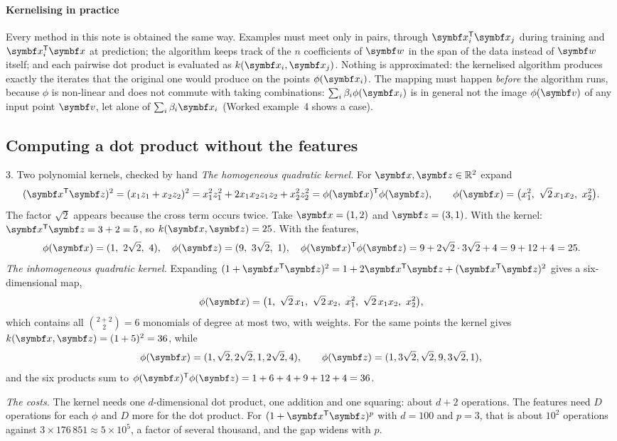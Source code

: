 \documentclass[11pt]{article}
\newcommand{\w}{\vect{w}}
\newcommand{\z}{\vect{z}}
\begin{document}
\paragraph{Kernelising in practice} Every method in this note is obtained the same way. Examples must meet only in
pairs, through $\x_i\T\x_j$ during training and $\x_i\T\x$ at prediction; the algorithm keeps track of the $n$
coefficients of $\w$ in the span of the data instead of $\w$ itself; and each pairwise dot product is evaluated as
$k(\x_i, \x_j)$. Nothing is approximated: the kernelised algorithm produces exactly the iterates that the original one
would produce on the points $\phi(\x_i)$. The mapping must happen \emph{before} the algorithm runs, because $\phi$ is
non-linear and does not commute with taking combinations: $\sum_i \beta_i\phi(\x_i)$ is in general not the image
$\phi(\vect{v})$ of any input point $\vect{v}$, let alone of $\sum_i \beta_i\x_i$ (Worked example~4 shows a case).

\subsection{Computing a dot product without the features}

\begin{worked}{3. Two polynomial kernels, checked by hand}
\emph{The homogeneous quadratic kernel.} For $\x, \z \in \R^2$ expand
\[
  (\x\T\z)^2 = (x_1z_1 + x_2z_2)^2 = x_1^2z_1^2 + 2x_1x_2z_1z_2 + x_2^2z_2^2 = \phi(\x)\T\phi(\z), \qquad
  \phi(\x) = \big(x_1^2,\ \sqrt2\,x_1x_2,\ x_2^2\big).
\]
The factor $\sqrt2$ appears because the cross term occurs twice. Take $\x = (1, 2)$ and $\z = (3, 1)$. With the
kernel: $\x\T\z = 3 + 2 = 5$, so $k(\x, \z) = 25$. With the features,
\[
  \phi(\x) = (1,\ 2\sqrt2,\ 4), \quad \phi(\z) = (9,\ 3\sqrt2,\ 1), \quad
  \phi(\x)\T\phi(\z) = 9 + 2\sqrt2 \cdot 3\sqrt2 + 4 = 9 + 12 + 4 = 25 .
\]
\emph{The inhomogeneous quadratic kernel.} Expanding $(1 + \x\T\z)^2 = 1 + 2\x\T\z + (\x\T\z)^2$ gives a six-dimensional
map,
\[
  \phi(\x) = \big(1,\ \sqrt2\,x_1,\ \sqrt2\,x_2,\ x_1^2,\ \sqrt2\,x_1x_2,\ x_2^2\big),
\]
which contains all $\binom{2+2}{2} = 6$ monomials of degree at most two, with weights. For the same points the kernel
gives $k(\x, \z) = (1 + 5)^2 = 36$, while
\[
  \phi(\x) = (1, \sqrt2, 2\sqrt2, 1, 2\sqrt2, 4), \qquad \phi(\z) = (1, 3\sqrt2, \sqrt2, 9, 3\sqrt2, 1),
\]
and the six products sum to $\phi(\x)\T\phi(\z) = 1 + 6 + 4 + 9 + 12 + 4 = 36$.

\emph{The costs.} The kernel needs one $d$-dimensional dot product, one addition and one squaring: about $d + 2$
operations. The features need $D$ operations for each $\phi$ and $D$ more for the dot product. For $(1 + \x\T\z)^p$
with $d = 100$ and $p = 3$, that is about $10^2$ operations against $3 \times 176\,851 \approx 5 \times 10^5$, a factor of
several thousand, and the gap widens with $p$.
\end{worked}
\end{document}
